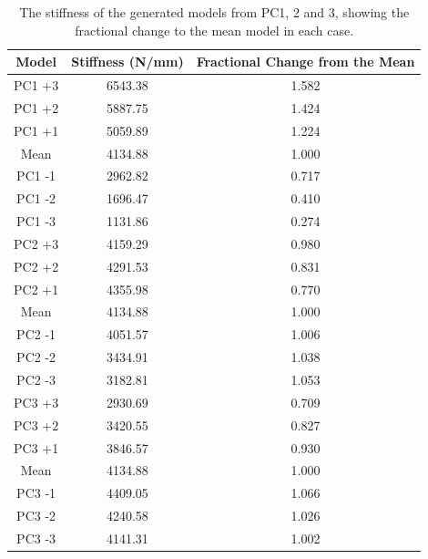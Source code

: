 \begin{table}[h]
\centering
\caption{The stiffness of the generated models from PC1, 2 and 3, showing the fractional change to the mean model in each case.}
\label{tab:stiffness_gen_models}
\begin{tabular}{c|c|c}
Model  & Stiffness (N/mm) & Fractional Change from the Mean \\ \hline \hline
PC1 +3 & 6543.38          & 1.582                           \\
PC1 +2 & 5887.75          & 1.424                           \\
PC1 +1 & 5059.89          & 1.224                           \\
Mean   & 4134.88          & 1.000                           \\
PC1 -1 & 2962.82          & 0.717                           \\
PC1 -2 & 1696.47          & 0.410                           \\
PC1 -3 & 1131.86          & 0.274                           \\ \hline
PC2 +3 & 4159.29          & 0.980                           \\
PC2 +2 & 4291.53          & 0.831                           \\
PC2 +1 & 4355.98          & 0.770                           \\
Mean   & 4134.88          & 1.000                           \\
PC2 -1 & 4051.57          & 1.006                           \\
PC2 -2 & 3434.91          & 1.038                           \\
PC2 -3 & 3182.81          & 1.053                           \\ \hline
PC3 +3 & 2930.69          & 0.709                           \\
PC3 +2 & 3420.55          & 0.827                           \\
PC3 +1 & 3846.57          & 0.930                           \\
Mean   & 4134.88          & 1.000                           \\
PC3 -1 & 4409.05          & 1.066                           \\
PC3 -2 & 4240.58          & 1.026                           \\ \hline
PC3 -3 & 4141.31          & 1.002                          
\end{tabular}
\end{table}

